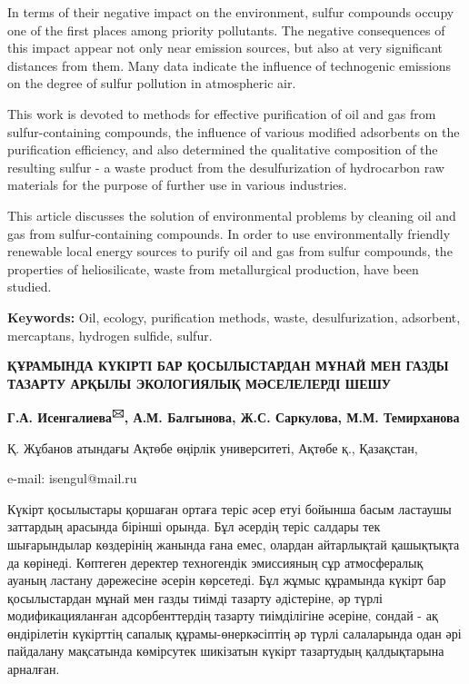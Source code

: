 In terms of their negative impact on the environment, sulfur compounds
occupy one of the first places among priority pollutants. The negative
consequences of this impact appear not only near emission sources, but
also at very significant distances from them. Many data indicate the
influence of technogenic emissions on the degree of sulfur pollution in
atmospheric air.

This work is devoted to methods for effective purification of oil and
gas from sulfur-containing compounds, the influence of various modified
adsorbents on the purification efficiency, and also determined the
qualitative composition of the resulting sulfur - a waste product from
the desulfurization of hydrocarbon raw materials for the purpose of
further use in various industries.

This article discusses the solution of environmental problems by
cleaning oil and gas from sulfur-containing compounds. In order to use
environmentally friendly renewable local energy sources to purify oil
and gas from sulfur compounds, the properties of heliosilicate, waste
from metallurgical production, have been studied.

{\bfseries Keywords:} Oil, ecology, purification methods, waste,
desulfurization, adsorbent, mercaptans, hydrogen sulfide, sulfur.

\begin{center}
{\large\bfseries ҚҰРАМЫНДА КҮКІРТІ БАР ҚОСЫЛЫСТАРДАН МҰНАЙ МЕН ГАЗДЫ ТАЗАРТУ АРҚЫЛЫ ЭКОЛОГИЯЛЫҚ МӘСЕЛЕЛЕРДІ ШЕШУ}

{\bfseries Г.А. Исенгалиева\textsuperscript{🖂}, А.М. Балгынова, Ж.С. Саркулова, М.М. Темирханова}

Қ. Жұбанов атындағы Ақтөбе өңірлік университеті, Ақтөбе қ., Қазақстан,

e-mail: isengul@mail.ru
\end{center}

Күкірт қосылыстары қоршаған ортаға теріс әсер етуі бойынша басым
ластаушы заттардың арасында бірінші орында. Бұл әсердің теріс салдары
тек шығарындылар көздерінің жанында ғана емес, олардан айтарлықтай
қашықтықта да көрінеді. Көптеген деректер техногендік эмиссияның сұр
атмосфералық ауаның ластану дәрежесіне әсерін көрсетеді. Бұл жұмыс
құрамында күкірт бар қосылыстардан мұнай мен газды тиімді тазарту
әдістеріне, әр түрлі модификацияланған адсорбенттердің тазарту
тиімділігіне әсеріне, сондай - ақ өндірілетін күкірттің сапалық
құрамы-өнеркәсіптің әр түрлі салаларында одан әрі пайдалану мақсатында
көмірсутек шикізатын күкірт тазартудың қалдықтарына арналған.

